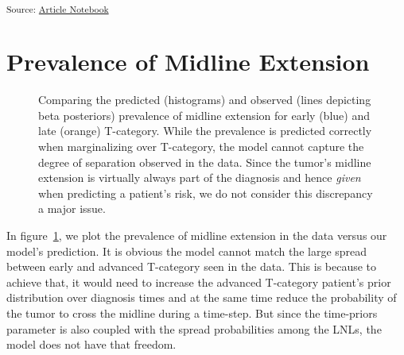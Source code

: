 \documentclass[
  sn-mathphys-num,
]{sn-jnl}
\begin{document}
\textsubscript{Source:
\href{https://rmnldwg.github.io/bilateral-paper/manuscript-preview.html}{Article
Notebook}}

\section{Prevalence of Midline Extension}\label{sec-prevalence-midext}

\begin{figure}


\caption{\label{fig-model-prevalences-midext}Comparing the predicted
(histograms) and observed (lines depicting beta posteriors) prevalence
of midline extension for early (blue) and late (orange) T-category.
While the prevalence is predicted correctly when marginalizing over
T-category, the model cannot capture the degree of separation observed
in the data. Since the tumor's midline extension is virtually always
part of the diagnosis and hence \emph{given} when predicting a patient's
risk, we do not consider this discrepancy a major issue.}

\end{figure}%

In figure~\ref{fig-model-prevalences-midext}, we plot the prevalence of
midline extension in the data versus our model's prediction. It is
obvious the model cannot match the large spread between early and
advanced T-category seen in the data. This is because to achieve that,
it would need to increase the advanced T-category patient's prior
distribution over diagnosis times and at the same time reduce the
probability of the tumor to cross the midline during a time-step. But
since the time-priors parameter is also coupled with the spread
probabilities among the LNLs, the model does not have that freedom.
\end{document}
